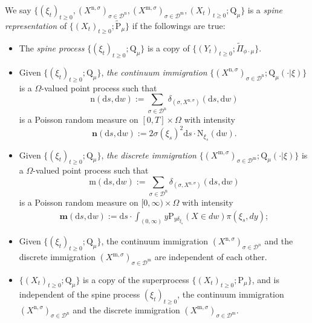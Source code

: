 \documentclass[12pt,a4paper]{amsart}
\numberwithin{equation}{section}
\theoremstyle{plain}
\theoremstyle{definition}
\theoremstyle{remark}
\begin{document}
We say $\{(\xi_t)_{t\geq 0}, (X^{\mathrm n, \sigma})_{\sigma\in \mathcal D^\mathrm n}, (X^{\mathrm m, \sigma})_{\sigma \in \mathcal D^\mathrm m}, (X_t)_{t\geq 0}; \mathrm Q_{\mu}\}$ is a \emph{spine representation} of $\{(X_t)_{t\geq 0}; \widetilde {\mathrm P}_\mu\}$ if the followings are true:
\begin{itemize}
	\item
	The \emph{spine process} $\{(\xi_t)_{t\geq 0}; \mathrm Q_\mu\}$ is a copy of $\{(Y_t)_{t\geq 0}; \widetilde \Pi_{\phi\cdot\mu}\}$.
	\item
	Given $\{(\xi_t)_{t\geq 0}; \mathrm Q_\mu\}$, \emph{the continuum immigration} $\{ (X^{\mathrm n,\sigma})_{\sigma \in \mathcal D^\mathrm n}; \mathrm Q_\mu(\cdot |\xi)\}$ is a $\Omega$-valued point process such that
	\[
	\mathrm n(\mathrm ds, \mathrm dw) := \sum_{\sigma\in \mathcal D^{\mathrm n}} \delta_{(\sigma, X^{\mathrm n,\sigma})}(\mathrm ds, \mathrm dw)
	\]
	is a Poisson random measure on $[0,T]\times \Omega$ with intensity
	\[
	\mathbf n(\mathrm ds, \mathrm dw):= 2 \sigma(\xi_s)^2 \mathrm ds \cdot \mathrm N_{\xi_s}(\mathrm dw).
	\]
	\item
	Given $\{(\xi_t)_{t\geq 0}; \mathrm Q_\mu\}$, \emph{the discrete immigration} $\{(X^{\mathrm m,\sigma})_{\sigma\in \mathcal D^{\mathrm m}}; \mathrm Q_\mu(\cdot |\xi)\}$ is a $\Omega$-valued point process such that
	\[
	\mathrm m(\mathrm ds, \mathrm dw) := \sum_{\sigma\in \mathcal D^{\mathrm n}} \delta_{(\sigma, X^{\mathrm n,\sigma})}(\mathrm ds, \mathrm dw)
	\]
	is a Poisson random measure on $[0,\infty ) \times \Omega$ with intensity
	\begin{align}
		\mathbf m(\mathrm ds, \mathrm dw):= \mathrm ds \cdot \int_{(0,\infty)} y \mathrm P_{y\delta_{\xi_s}}(X\in dw) \pi(\xi_s,dy);
	\end{align}
	\item
	Given $\{(\xi_t)_{t\geq 0}; \mathrm Q_\mu\}$, the continuum immigration $(X^{\mathrm n,\sigma})_{\sigma \in \mathcal D^n}$ and the discrete immigration $(X^{\mathrm m,\sigma})_{\sigma\in \mathcal D^{\mathrm m}}$ are independent of each other.
	\item
	$\{(X_t)_{t\geq 0}; \mathrm Q_\mu\}$ is a copy of the superprocess $\{(X_t)_{t\geq 0}; \mathrm P_\mu\}$, and is independent of the spine process $(\xi_t)_{t\geq 0}$, the continuum immigration $(X^{\mathrm n,\sigma})_{\sigma \in \mathcal D^\mathrm n}$ and the discrete immigration $(X^{\mathrm m,\sigma})_{\sigma\in \mathcal D^{\mathrm m}}$.
\end{itemize}
\end{document}
